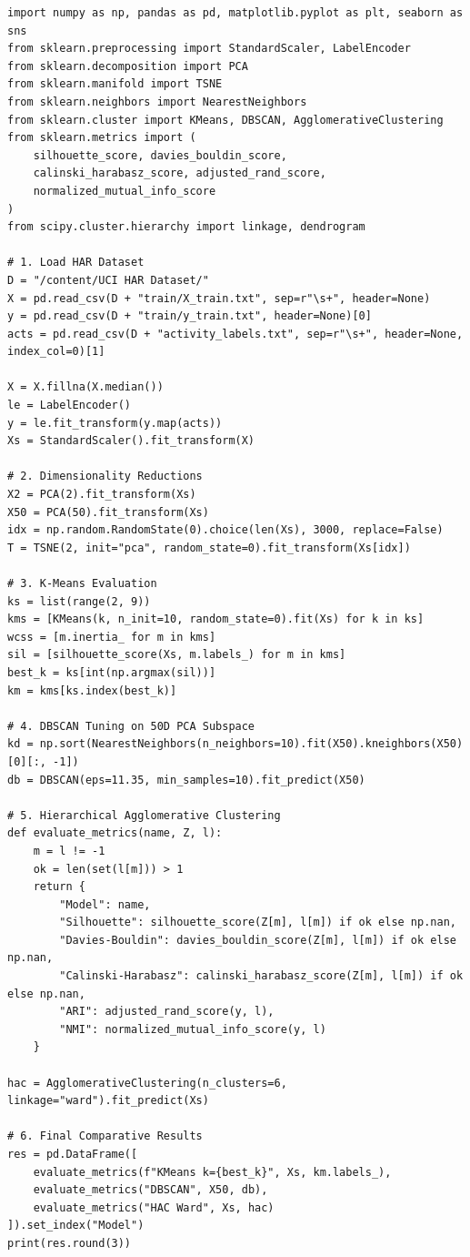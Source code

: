 \documentclass[12pt,a4paper]{article}
\begin{document}
\begin{lstlisting}
import numpy as np, pandas as pd, matplotlib.pyplot as plt, seaborn as sns
from sklearn.preprocessing import StandardScaler, LabelEncoder
from sklearn.decomposition import PCA
from sklearn.manifold import TSNE
from sklearn.neighbors import NearestNeighbors
from sklearn.cluster import KMeans, DBSCAN, AgglomerativeClustering
from sklearn.metrics import (
    silhouette_score, davies_bouldin_score,
    calinski_harabasz_score, adjusted_rand_score,
    normalized_mutual_info_score
)
from scipy.cluster.hierarchy import linkage, dendrogram

# 1. Load HAR Dataset
D = "/content/UCI HAR Dataset/"
X = pd.read_csv(D + "train/X_train.txt", sep=r"\s+", header=None)
y = pd.read_csv(D + "train/y_train.txt", header=None)[0]
acts = pd.read_csv(D + "activity_labels.txt", sep=r"\s+", header=None, index_col=0)[1]

X = X.fillna(X.median())
le = LabelEncoder()
y = le.fit_transform(y.map(acts))
Xs = StandardScaler().fit_transform(X)

# 2. Dimensionality Reductions
X2 = PCA(2).fit_transform(Xs)
X50 = PCA(50).fit_transform(Xs)
idx = np.random.RandomState(0).choice(len(Xs), 3000, replace=False)
T = TSNE(2, init="pca", random_state=0).fit_transform(Xs[idx])

# 3. K-Means Evaluation
ks = list(range(2, 9))
kms = [KMeans(k, n_init=10, random_state=0).fit(Xs) for k in ks]
wcss = [m.inertia_ for m in kms]
sil = [silhouette_score(Xs, m.labels_) for m in kms]
best_k = ks[int(np.argmax(sil))]
km = kms[ks.index(best_k)]

# 4. DBSCAN Tuning on 50D PCA Subspace
kd = np.sort(NearestNeighbors(n_neighbors=10).fit(X50).kneighbors(X50)[0][:, -1])
db = DBSCAN(eps=11.35, min_samples=10).fit_predict(X50)

# 5. Hierarchical Agglomerative Clustering
def evaluate_metrics(name, Z, l):
    m = l != -1
    ok = len(set(l[m])) > 1
    return {
        "Model": name,
        "Silhouette": silhouette_score(Z[m], l[m]) if ok else np.nan,
        "Davies-Bouldin": davies_bouldin_score(Z[m], l[m]) if ok else np.nan,
        "Calinski-Harabasz": calinski_harabasz_score(Z[m], l[m]) if ok else np.nan,
        "ARI": adjusted_rand_score(y, l),
        "NMI": normalized_mutual_info_score(y, l)
    }

hac = AgglomerativeClustering(n_clusters=6, linkage="ward").fit_predict(Xs)

# 6. Final Comparative Results
res = pd.DataFrame([
    evaluate_metrics(f"KMeans k={best_k}", Xs, km.labels_),
    evaluate_metrics("DBSCAN", X50, db),
    evaluate_metrics("HAC Ward", Xs, hac)
]).set_index("Model")
print(res.round(3))
\end{lstlisting}
\end{document}
